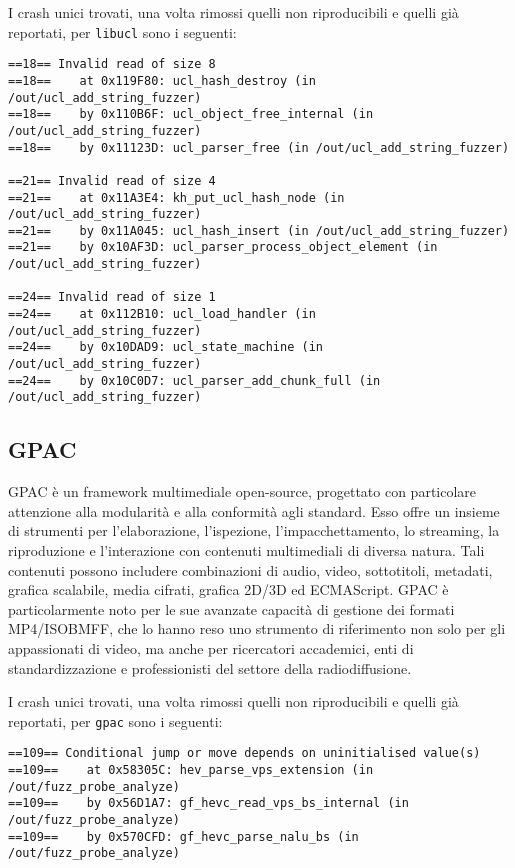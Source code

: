 I crash unici trovati, una volta rimossi quelli non riproducibili e quelli già reportati, per \texttt{libucl} sono i seguenti:

\begin{verbatim}
==18== Invalid read of size 8
==18==    at 0x119F80: ucl_hash_destroy (in /out/ucl_add_string_fuzzer)
==18==    by 0x110B6F: ucl_object_free_internal (in /out/ucl_add_string_fuzzer)
==18==    by 0x11123D: ucl_parser_free (in /out/ucl_add_string_fuzzer)

==21== Invalid read of size 4
==21==    at 0x11A3E4: kh_put_ucl_hash_node (in /out/ucl_add_string_fuzzer)
==21==    by 0x11A045: ucl_hash_insert (in /out/ucl_add_string_fuzzer)
==21==    by 0x10AF3D: ucl_parser_process_object_element (in /out/ucl_add_string_fuzzer)

==24== Invalid read of size 1
==24==    at 0x112B10: ucl_load_handler (in /out/ucl_add_string_fuzzer)
==24==    by 0x10DAD9: ucl_state_machine (in /out/ucl_add_string_fuzzer)
==24==    by 0x10C0D7: ucl_parser_add_chunk_full (in /out/ucl_add_string_fuzzer)
\end{verbatim}

\subsection{GPAC}

GPAC è un framework multimediale open-source, progettato con particolare attenzione alla modularità e alla conformità agli standard. Esso offre un insieme di strumenti per l’elaborazione, l’ispezione, l’impacchettamento, lo streaming, la riproduzione e l’interazione con contenuti multimediali di diversa natura.
Tali contenuti possono includere combinazioni di audio, video, sottotitoli, metadati, grafica scalabile, media cifrati, grafica 2D/3D ed ECMAScript.
GPAC è particolarmente noto per le sue avanzate capacità di gestione dei formati MP4/ISOBMFF, che lo hanno reso uno strumento di riferimento non solo per gli appassionati di video, ma anche per ricercatori accademici, enti di standardizzazione e professionisti del settore della radiodiffusione.

I crash unici trovati, una volta rimossi quelli non riproducibili e quelli già reportati, per \texttt{gpac} sono i seguenti:

\begin{verbatim}
==109== Conditional jump or move depends on uninitialised value(s)
==109==    at 0x58305C: hev_parse_vps_extension (in /out/fuzz_probe_analyze)
==109==    by 0x56D1A7: gf_hevc_read_vps_bs_internal (in /out/fuzz_probe_analyze)
==109==    by 0x570CFD: gf_hevc_parse_nalu_bs (in /out/fuzz_probe_analyze)
\end{verbatim}


